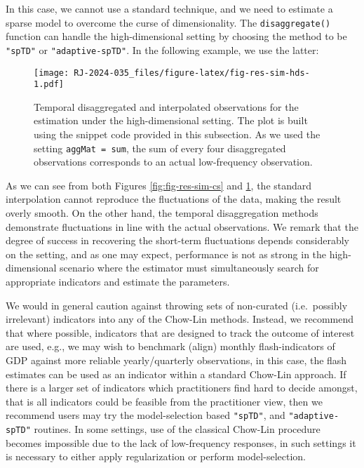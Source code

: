 In this case, we cannot use a standard technique, and we need to estimate a sparse model to overcome the curse of dimensionality. The \texttt{disaggregate()} function can handle the high-dimensional setting by choosing the method to be \texttt{"spTD"} or \texttt{"adaptive-spTD"}. In the following example, we use the latter:

\begin{figure}
\centering
\texttt{[image: RJ-2024-035\_files/figure-latex/fig-res-sim-hds-1.pdf]}
\caption{\label{fig:fig-res-sim-hds}Temporal disaggregated and interpolated observations for the estimation under the high-dimensional setting. The plot is built using the snippet code provided in this subsection. As we used the setting \texttt{aggMat\ =\ sum}, the sum of every four disaggregated observations corresponds to an actual low-frequency observation.}
\end{figure}

As we can see from both Figures \ref{fig:fig-res-sim-cs} and \ref{fig:fig-res-sim-hds}, the standard interpolation cannot reproduce the fluctuations of the data, making the result overly smooth. On the other hand, the temporal disaggregation methods demonstrate fluctuations in line with the actual observations. We remark that the degree of success in recovering the short-term fluctuations depends considerably on the setting, and as one may expect, performance is not as strong in the high-dimensional scenario where the estimator must simultaneously search for appropriate indicators and estimate the parameters.

We would in general caution against throwing sets of non-curated (i.e.~possibly irrelevant) indicators into any of the Chow-Lin methods. Instead, we recommend that where possible, indicators that are designed to track the outcome of interest are used, e.g., we may wish to benchmark (align) monthly flash-indicators of GDP against more reliable yearly/quarterly observations, in this case, the flash estimates can be used as an indicator within a standard Chow-Lin approach. If there is a larger set of indicators which practitioners find hard to decide amongst, that is all indicators could be feasible from the practitioner view, then we recommend users may try the model-selection based \texttt{"spTD"}, and \texttt{"adaptive-spTD"} routines. In some settings, use of the classical Chow-Lin procedure becomes impossible due to the lack of low-frequency responses, in such settings it is necessary to either apply regularization or perform model-selection.

